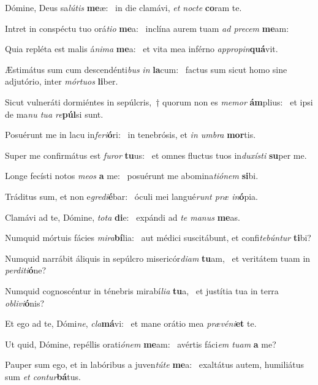 \item Dómine, Deus sa\textit{lútis} \textbf{me}æ:~\psstar{} in die clamávi, \textit{et nocte} \textbf{co}ram te.
\item Intret in conspéctu tuo orá\textit{tio} \textbf{me}a:~\psstar{} inclína aurem tuam \textit{ad precem} \textbf{me}am:
\item Quia repléta est malis á\textit{nima} \textbf{me}a:~\psstar{} et vita mea inférno \textit{appropin}\textbf{quá}vit.
\item Æstimátus sum cum descendénti\textit{bus} \textit{in} \textbf{la}cum:~\psstar{} factus sum sicut homo sine adjutório, inter \textit{mórtuos} \textbf{li}ber.
\item Sicut vulneráti dormiéntes in sepúlcris,~† quorum non es \textit{memor} \textbf{ám}plius:~\psstar{} et ipsi de ma\textit{nu tua re}\textbf{púl}si sunt.
\item Posuérunt me in lacu in\textit{feri}\textbf{ó}ri:~\psstar{} in tenebrósis, et \textit{in umbra} \textbf{mor}tis.
\item Super me confirmátus est \textit{furor} \textbf{tu}us:~\psstar{} et omnes fluctus tuos in\textit{duxísti} \textbf{su}per me.
\item Longe fecísti notos \textit{meos} \textbf{a} me:~\psstar{} posuérunt me abomina\textit{tiónem} \textbf{si}bi.
\item Tráditus sum, et non e\textit{gredi}\textbf{é}bar:~\psstar{} óculi mei langué\textit{runt præ in}\textbf{ó}pia.
\item Clamávi ad te, Dómine, \textit{tota} \textbf{di}e:~\psstar{} expándi ad \textit{te manus} \textbf{me}as.
\item Numquid mórtuis fácies \textit{mira}\textbf{bí}lia:~\psstar{} aut médici suscitábunt, et confi\textit{tebúntur} \textbf{ti}bi?
\item Numquid narrábit áliquis in sepúlcro misericór\textit{diam} \textbf{tu}am,~\psstar{} et veritátem tuam in \textit{perditi}\textbf{ó}ne?
\item Numquid cognoscéntur in ténebris mirabí\textit{lia} \textbf{tu}a,~\psstar{} et justítia tua in terra \textit{oblivi}\textbf{ó}nis?
\item Et ego ad te, Dómi\textit{ne}, \textit{cla}\textbf{má}vi:~\psstar{} et mane orátio mea \textit{prævéni}\textbf{et} te.
\item Ut quid, Dómine, repéllis orati\textit{ónem} \textbf{me}am:~\psstar{} avértis fáci\textit{em tuam} \textbf{a} me?
\item Pauper sum ego, et in labóribus a juven\textit{túte} \textbf{me}a:~\psstar{} exaltátus autem, humiliátus sum \textit{et contur}\textbf{bá}tus.
